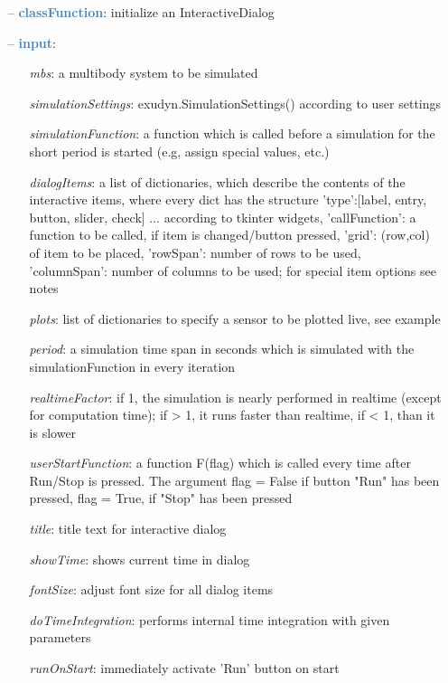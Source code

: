 \begin{itemize}[leftmargin=1.4cm]
\begin{itemize}[leftmargin=0.5cm]
\begin{itemize}[leftmargin=1.4cm]
\begin{itemize}[leftmargin=0.5cm]
\begin{itemize}[leftmargin=1.4cm]
\begin{itemize}[leftmargin=0.5cm]
\begin{itemize}[leftmargin=1.4cm]
\begin{itemize}[leftmargin=1.4cm]
\begin{itemize}[leftmargin=0.7cm]
  \item[--]  \textcolor{steelblue}{\bf classFunction}: initialize an InteractiveDialog  \item[--]  \textcolor{steelblue}{\bf input}: \vspace{-6pt}
  \begin{itemize}[leftmargin=1.2cm]
\setlength{\itemindent}{-0.7cm}
    \item[] {\it mbs}: a multibody system to be simulated
    \item[] {\it   simulationSettings}: exudyn.SimulationSettings() according to user settings
    \item[] {\it   simulationFunction}: a function which is called before a simulation for the short period is started (e.g, assign special values, etc.)
    \item[] {\it   dialogItems}: a list of dictionaries, which describe the contents of the interactive items, where every dict has the structure {'type':[label, entry, button, slider, check] ... according to tkinter widgets, 'callFunction': a function to be called, if item is changed/button pressed, 'grid': (row,col) of item to be placed, 'rowSpan': number of rows to be used, 'columnSpan': number of columns to be used; for special item options see notes}
    \item[] {\it   plots}: list of dictionaries to specify a sensor to be plotted live, see example
    \item[] {\it   period}: a simulation time span in seconds which is simulated with the simulationFunction in every iteration
    \item[] {\it   realtimeFactor}: if 1, the simulation is nearly performed in realtime (except for computation time); if > 1, it runs faster than realtime, if < 1, than it is slower
    \item[] {\it   userStartFunction}: a function F(flag) which is called every time after Run/Stop is pressed. The argument flag = False if button "Run" has been pressed, flag = True, if "Stop" has been pressed
    \item[] {\it   title}: title text for interactive dialog
    \item[] {\it   showTime}: shows current time in dialog
    \item[] {\it   fontSize}: adjust font size for all dialog items
    \item[] {\it   doTimeIntegration}: performs internal time integration with given parameters
    \item[] {\it   runOnStart}: immediately activate 'Run' button on start

\end{itemize}
\end{itemize}
\end{itemize}
\end{itemize}
\end{itemize}
\end{itemize}
\end{itemize}
\end{itemize}
\end{itemize}
\end{itemize}
